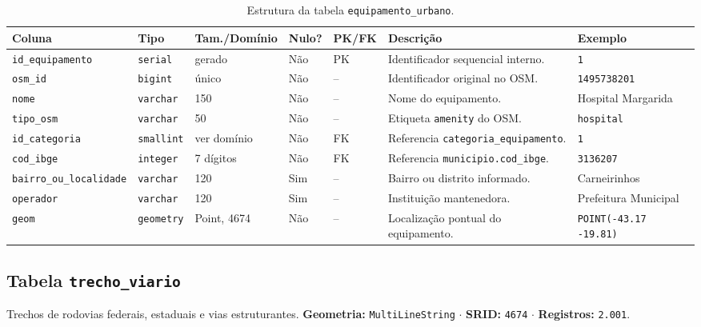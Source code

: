 \documentclass[
    12pt,
    oneside,
    a4paper,
    chapter=TITLE,
    section=TITLE,
    brazil
]{abntex2}
\begin{document}
\begin{table}[H]
\centering
\caption{Estrutura da tabela \texttt{equipamento\_urbano}.}
\label{tab:equipamento}
\scriptsize
\begin{tabularx}{\textwidth}{p{2.6cm} p{1.4cm} p{2.1cm} p{0.9cm} p{0.9cm} X p{2.1cm}}
\toprule
\textbf{Coluna} & \textbf{Tipo} & \textbf{Tam./Domínio} & \textbf{Nulo?} & \textbf{PK/FK} & \textbf{Descrição} & \textbf{Exemplo} \\
\midrule
\texttt{id\_equipamento} & \texttt{serial} & gerado & Não & PK & Identificador sequencial interno. & \texttt{1} \\
\texttt{osm\_id} & \texttt{bigint} & único & Não & -- & Identificador original no OSM. & \texttt{1495738201} \\
\texttt{nome} & \texttt{varchar} & 150 & Não & -- & Nome do equipamento. & Hospital Margarida \\
\texttt{tipo\_osm} & \texttt{varchar} & 50 & Não & -- & Etiqueta \texttt{amenity} do OSM. & \texttt{hospital} \\
\texttt{id\_categoria} & \texttt{smallint} & ver domínio & Não & FK & Referencia \texttt{categoria\_equipamento}. & \texttt{1} \\
\texttt{cod\_ibge} & \texttt{integer} & 7 dígitos & Não & FK & Referencia \texttt{municipio.cod\_ibge}. & \texttt{3136207} \\
\texttt{bairro\_ou\_\allowbreak localidade} & \texttt{varchar} & 120 & Sim & -- & Bairro ou distrito informado. & Carneirinhos \\
\texttt{operador} & \texttt{varchar} & 120 & Sim & -- & Instituição mantenedora. & Prefeitura Municipal \\
\texttt{geom} & \texttt{geometry} & Point, 4674 & Não & -- & Localização pontual do equipamento. & \texttt{POINT(-43.17 -19.81)} \\
\bottomrule
\end{tabularx}
\end{table}

\subsection{Tabela \texttt{trecho\_viario}}
Trechos de rodovias federais, estaduais e vias estruturantes. \textbf{Geometria:} \texttt{MultiLineString} $\cdot$ \textbf{SRID:} \texttt{4674} $\cdot$ \textbf{Registros:} \texttt{2.001}.
\end{document}
